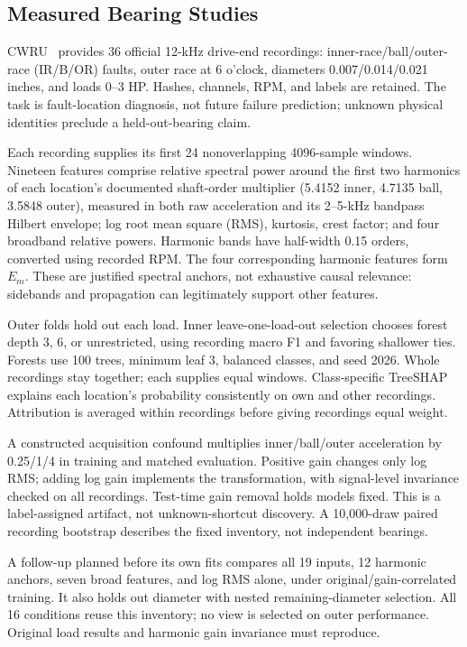 \documentclass[conference]{IEEEtran}
\begin{document}
\subsection{Measured Bearing Studies}
\label{sec:cwru-setup}
CWRU~\cite{cwru2026} provides 36 official 12-kHz drive-end recordings: inner-race/ball/outer-race (IR/B/OR) faults, outer race at 6 o'clock, diameters 0.007/0.014/0.021 inches, and loads 0--3 HP. Hashes, channels, RPM, and labels are retained. The task is fault-location diagnosis, not future failure prediction; unknown physical identities preclude a held-out-bearing claim.

Each recording supplies its first 24 nonoverlapping 4096-sample windows. Nineteen features comprise relative spectral power around the first two harmonics of each location's documented shaft-order multiplier (5.4152 inner, 4.7135 ball, 3.5848 outer), measured in both raw acceleration and its 2--5-kHz bandpass Hilbert envelope; log root mean square (RMS), kurtosis, crest factor; and four broadband relative powers. Harmonic bands have half-width 0.15 orders, converted using recorded RPM. The four corresponding harmonic features form $E_m$. These are justified spectral anchors, not exhaustive causal relevance: sidebands and propagation can legitimately support other features.

Outer folds hold out each load. Inner leave-one-load-out selection chooses forest depth 3, 6, or unrestricted, using recording macro F1 and favoring shallower ties. Forests use 100 trees, minimum leaf 3, balanced classes, and seed 2026. Whole recordings stay together; each supplies equal windows. Class-specific TreeSHAP explains each location's probability consistently on own and other recordings. Attribution is averaged within recordings before giving recordings equal weight.

A constructed acquisition confound multiplies inner/ball/outer acceleration by 0.25/1/4 in training and matched evaluation. Positive gain changes only log RMS; adding log gain implements the transformation, with signal-level invariance checked on all recordings. Test-time gain removal holds models fixed. This is a label-assigned artifact, not unknown-shortcut discovery. A 10{,}000-draw paired recording bootstrap describes the fixed inventory, not independent bearings.

A follow-up planned before its own fits compares all 19 inputs, 12 harmonic anchors, seven broad features, and log RMS alone, under original/gain-correlated training. It also holds out diameter with nested remaining-diameter selection. All 16 conditions reuse this inventory; no view is selected on outer performance. Original load results and harmonic gain invariance must reproduce.
\end{document}
